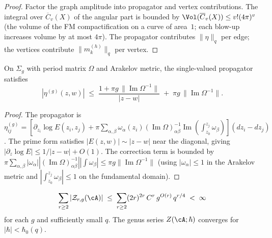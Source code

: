 \begin{proof}
Factor the graph amplitude into propagator and vertex
contributions.  The integral over $\overline{C}_v(X)$ of
the angular part is bounded by $\Vol(\overline{C}_v(X))
\leq v! (4\pi)^v$ (the volume of the FM compactification
on a curve of area~$1$; each blow-up increases volume by at
most $4\pi$).  The propagator contributes $\|\eta\|_q$ per
edge; the vertices contribute $\|m_k^{(h)}\|_q$ per vertex.
\end{proof}

\begin{proposition}%
\label{prop:g1-propagator-bound}%
%
On $\Sigma_g$ with period matrix $\Omega$ and Arakelov metric,
the single-valued propagator satisfies
\begin{equation}\label{eq:g1-propagator-bound}
|\eta^{(g)}(z,w)|
\;\leq\;
\frac{1 + \pi g\,\|\operatorname{Im}\Omega^{-1}\|}
{|z - w|}
\;+\;
\pi g\,\|\operatorname{Im}\Omega^{-1}\|.
\end{equation}
\end{proposition}

\begin{proof}
The propagator is $\eta^{(g)}_{ij} =
[\partial_{z_i}\log E(z_i,z_j) +
\pi\sum_{\alpha,\beta}
\omega_\alpha(z_i)(\operatorname{Im}\Omega)^{-1}_{\alpha\beta}
\operatorname{Im}(\int_{z_0}^{z_j}\omega_\beta)]
(dz_i - dz_j)$.
The prime form satisfies $|E(z,w)| \sim |z - w|$ near the
diagonal, giving $|\partial_z \log E| \leq 1/|z-w| + O(1)$.
The correction term is bounded by
$\pi \sum_{\alpha,\beta} |\omega_\alpha|
|(\operatorname{Im}\Omega)^{-1}_{\alpha\beta}|
|\int \omega_\beta| \leq
\pi g \|\operatorname{Im}\Omega^{-1}\|$ (using
$|\omega_\alpha| \leq 1$ in the Arakelov metric and
$|\int_{z_0}^{z_j} \omega_\beta| \leq 1$ on the
fundamental domain).
\end{proof}

\begin{corollary}%
\label{cor:g1-genus-bound}%
%
\begin{equation}\label{eq:g1-genus-total-bound}
\sum_{r \geq 2}
|\mathcal{Z}_{r,g}(\cA)|
\;\leq\;
\sum_{r \geq 2}
(2r)^{2r}\,C^r\,g^{O(r)}\,q^{r/4}
\;<\;\infty
\end{equation}
for each $g$ and sufficiently small $q$.
The genus series $Z(\cA;\hbar)$ converges for
$|\hbar| < \hbar_0(q)$.
\end{corollary}

